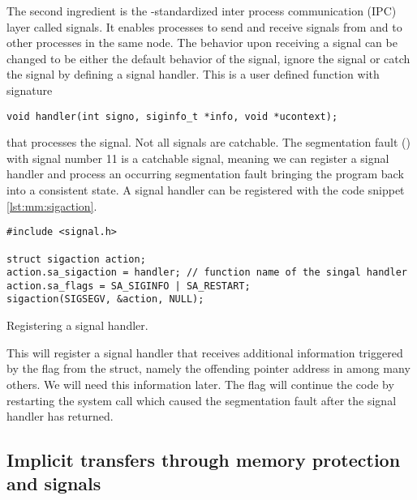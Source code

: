 The second ingredient is the \posix-standardized inter process communication (IPC) layer called signals.
It enables processes to send and receive signals from and to other processes in the same node.
The behavior upon receiving a signal can be changed to be either the default behavior of the signal, ignore the signal or catch the signal by defining a signal handler.
This is a user defined function with signature
\begin{verbatim}
void handler(int signo, siginfo_t *info, void *ucontext);
\end{verbatim}
that processes the signal.
Not all signals are catchable.
The segmentation fault () with signal number \num{11} is a catchable signal, meaning we can register a signal handler and process an occurring segmentation fault bringing the program back into a consistent state.
A signal handler can be registered with the code snippet \cref{lst:mm:sigaction}.
\begin{codelisting}
\begin{verbatim}
#include <signal.h>

struct sigaction action;
action.sa_sigaction = handler; // function name of the singal handler
action.sa_flags = SA_SIGINFO | SA_RESTART;
sigaction(SIGSEGV, &action, NULL);
\end{verbatim}
\caption{Registering a signal handler.}
\label{lst:mm:sigaction}
\end{codelisting}
This will register a signal handler that receives additional information triggered by the  flag from the  struct, namely the offending pointer address in  among many others.
We will need this information later.
The flag  will continue the code by restarting the system call which caused the segmentation fault after the signal handler has returned.

\subsection{Implicit transfers through memory protection and signals}

